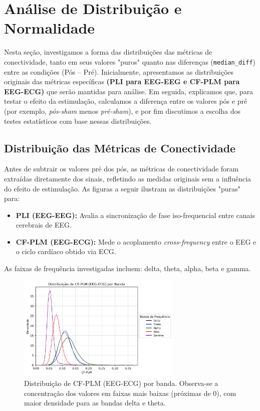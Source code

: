 \chapter{Análise de Distribuição e Normalidade}
\label{chap:analise_distribuicao_normalidade}

Nesta seção, investigamos a forma das distribuições das métricas de conectividade, tanto em seus valores "puros" quanto nas diferenças (\texttt{median\_diff}) entre as condições (Pós – Pré). Inicialmente, apresentamos as distribuições originais das métricas específicas \textbf{(PLI para EEG-EEG e CF-PLM para EEG-ECG)} que serão mantidas para análise. Em seguida, explicamos que, para testar o efeito da estimulação, calculamos a diferença entre os valores pós e pré (por exemplo, \emph{pós-sham} menos \emph{pré-sham}), e por fim discutimos a escolha dos testes estatísticos com base nessas distribuições.

\section{Distribuição das Métricas de Conectividade}

Antes de subtrair os valores pré dos pós, as métricas de conectividade foram extraídas diretamente dos sinais, refletindo as medidas originais sem a influência do efeito de estimulação. As figuras a seguir ilustram as distribuições "puras" para:

\begin{itemize}
    \item \textbf{PLI (EEG-EEG):} Avalia a sincronização de fase iso-frequencial entre canais cerebrais de EEG.
    \item \textbf{CF-PLM (EEG-ECG):} Mede o acoplamento \emph{cross-frequency} entre o EEG e o ciclo cardíaco obtido via ECG.
\end{itemize}

As faixas de frequência investigadas incluem: delta, theta, alpha, beta e gamma.

\begin{figure}[htb]
    \centering
    \includegraphics[width=0.7\textwidth]{figs/3_1_connectivity_metrics/Distribuição_de_CF-PLM_(EEG-ECG)_por_Banda.png}
    \caption{Distribuição de CF-PLM (EEG-ECG) por banda. Observa-se a concentração dos valores em faixas mais baixas (próximas de 0), com maior densidade para as bandas delta e theta.}
    \label{fig:cfplm_eeg_ecg}
\end{figure}

